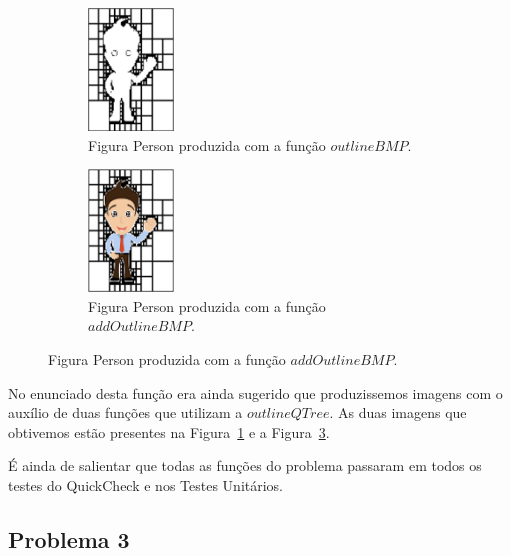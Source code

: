 \documentclass[a4paper]{article}
\newcommand{\Varid}[1]{\mathit{#1}}
\begin{document}
\begin{enumerate}
\begin{figure}
\begin{subfigure}{0.4\textwidth}
    \begin{center}
    \includegraphics[width=0.25\textwidth]{imgs/outline1.png}
    \end{center}
    \caption{Figura Person produzida com a função \ensuremath{\Varid{outlineBMP}}.}
    \label{fig:outline1}
\end{subfigure}
\begin{subfigure}{0.4\textwidth}
    \begin{center}
    \includegraphics[width=0.25\textwidth]{imgs/outline2.png}
    \end{center}
    \caption{Figura Person produzida com a função \ensuremath{\Varid{addOutlineBMP}}.}
    \label{fig:outline2}
\end{subfigure}
\end{figure}


No enunciado desta função era ainda sugerido que produzissemos imagens
com o auxílio de duas funções que utilizam a \ensuremath{\Varid{outlineQTree}}. As duas
imagens que obtivemos estão presentes na Figura~\ref{fig:outline1}
e a Figura~\ref{fig:outline2}.

\end{enumerate}


É ainda de salientar que todas as funções do problema passaram em todos os testes
do QuickCheck e nos Testes Unitários.

\subsection*{Problema 3}
\end{document}
